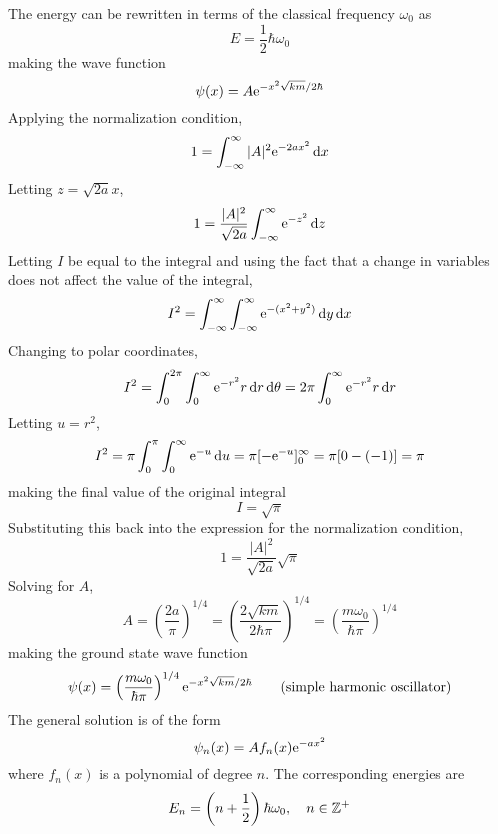 \documentclass{subfiles}
\begin{document}
			The energy can be rewritten in terms of the classical frequency \(\omega_0\) as
			\[E = \frac{1}{2}\hbar\omega_0\]
			making the wave function
			\[\psi(x) = A\text{e}^{-x^2\sqrt{km}/2\hbar}\]
			Applying the normalization condition,
			\[1 = \int_{-\infty}^\infty |A|^2\text{e}^{-2ax^2}\dd{x}\]
			Letting \(z = \sqrt{2a}x\),
			\[
				1 = \frac{|A|^2}{\sqrt{2a}}\int_{-\infty}^\infty \text{e}^{-z^2} \dd{z}
			\]
			Letting \(I\) be equal to the integral and using the fact that a change in variables does not affect the value of the integral,
			\[I^2 = \int_{-\infty}^\infty\int_{-\infty}^\infty \text{e}^{-(x^2 + y^2)}\dd{y}\dd{x}\]
			Changing to polar coordinates,
			\[
				I^2 = \int_0^{2\pi}\int_0^\infty \text{e}^{-r^2}r\dd{r}\dd{\theta}
					= 2\pi\int_0^\infty \text{e}^{-r^2}r\dd{r}
			\]
			Letting \(u = r^2\),
			\[
				I^2 = \pi\int_0^\pi\int_0^\infty \text{e}^{-u}\dd{u}
					= \pi[-\text{e}^{-u}]_0^\infty = \pi[0 - (-1)] = \pi
			\]
			making the final value of the original integral
			\[I = \sqrt{\pi}\]
			Substituting this back into the expression for the normalization condition,
			\[1 = \frac{|A|^2}{\sqrt{2a}}\sqrt{\pi}\]
			Solving for \(A\),
			\[
				A = \left(\frac{2a}{\pi}\right)^{1/4}
					= \left(\frac{2\sqrt{km}}{2\hbar\pi}\right)^{1/4}
					= \left(\frac{m\omega_0}{\hbar\pi}\right)^{1/4}
			\]
			making the ground state wave function
			\[\psi(x) = \left(\frac{m\omega_0}{\hbar\pi}\right)^{1/4}\text{e}^{-x^2\sqrt{km}/2\hbar} \tag{simple harmonic oscillator}\]
			The general solution is of the form
			\[\psi_n(x) = Af_n(x)\text{e}^{-ax^2}\]
			where \(f_n(x)\) is a polynomial of degree \(n\). The corresponding energies are
			\[
				E_n = \left(n + \frac{1}{2}\right)\hbar\omega_0 
					, \quad n \in \mathbb{Z}^+
			\]
\end{document}
